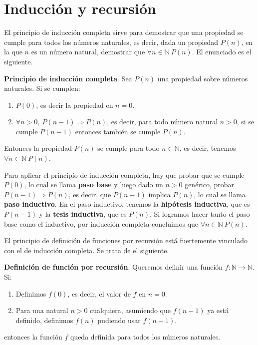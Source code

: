\documentclass[a4paper, 12pt]{report}
\newcommand{\Ra}{\Rightarrow}
\newcommand{\N}{\mathbb{N}}
\theoremstyle{definition}
\begin{document}
\section{Inducción y recursión}

El principio de inducción completa sirve para demostrar que una propiedad se cumple para todos los números naturales, es decir, dada un propiedad $P(n)$, en la que $n$ es un número natural, demostrar que $\forall n\in\N~P(n)$. El enunciado es el siguiente.

\vspace{0.5em}
{\bf Principio de inducción completa}. Sea $P(n)$ una propiedad sobre números naturales. Si se cumplen:
\begin{enumerate}
	\item $P(0)$, es decir la propiedad en $n=0$. 
	\item $\forall n>0,~P(n-1)\Ra P(n)$, es decir, para todo número natural $n>0$, si se cumple $P(n-1)$ entonces también se cumple $P(n)$. 
\end{enumerate} 
Entonces la propiedad $P(n)$ se cumple para todo $n\in\N$, es decir, tenemos $\forall n\in\N~P(n)$.

\vspace{0.5em}
Para aplicar el principío de inducción completa, hay que probar que se cumple $P(0)$, lo cual se llama {\bf paso base} y luego dado un $n>0$ genérico, probar $P(n-1)\Ra P(n)$, es decir, que $P(n-1)$ implica $P(n)$, lo cual se llama {\bf paso inductivo}. En el paso inductivo, tenemos la {\bf hipótesis inductiva}, que es $P(n-1)$ y la {\bf tesis inductiva}, que es $P(n)$. Si logramos hacer tanto el paso base como el inductivo, por inducción completa concluimos que $\forall n\in\N~P(n)$.

El principio de definición de funciones por recursión está fuertemente vinculado con el de inducción completa. Se trata de el siguiente.

\vspace{0.5em}
{\bf Definición de función por recursión}. Queremos definir una función $f:\N\to\N$. Si:
\begin{enumerate}
	\item Definimos $f(0)$, es decir, el valor de $f$ en $n=0$.
	\item Para una natural $n>0$ cualquiera, asumiendo que $f(n-1)$ ya está definido, definimos $f(n)$ pudiendo usar $f(n-1)$.
\end{enumerate}
entonces la función $f$ queda definida para todos los números naturales.
\end{document}
